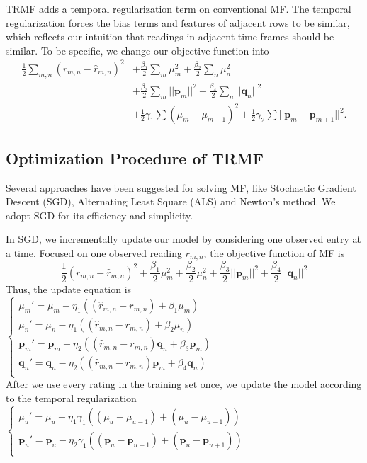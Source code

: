TRMF adds a temporal regularization term on conventional MF. The temporal regularization forces the bias terms and features of adjacent rows to be similar, which reflects our intuition that readings in adjacent time frames should be similar. To be specific, we change our objective function into 
\begin{equation*}\begin{aligned}
\frac{1}{2}\sum_{m,n}{(r_{m,n} - \hat{r}_{m,n})}^2 &+ \frac{\beta_1}{2}\sum_m{\mu_m^2} + \frac{\beta_2}{2}\sum_n{\mu_n^2}\\
&+ \frac{\beta_3}{2}\sum_m{||\mathbf{p}_m||^2} + \frac{\beta_4}{2}\sum_n{||\mathbf{q}_n||^2}\\ 
&+ \frac{1}{2}\gamma_1\sum{(\mu_m-\mu_{m+1})^2} + \frac{1}{2}\gamma_2\sum{||\mathbf{p}_m-\mathbf{p}_{m+1}||^2}.
\end{aligned}\end{equation*}

\subsection{Optimization Procedure of TRMF}
\label{optimation_procedure}
Several approaches have been suggested for solving MF, like Stochastic Gradient Descent (SGD)\cite{koren2009matrix,chih2008large}, Alternating Least Square (ALS)\cite{koren2009matrix,zhou2008large} and Newton's method\cite{buchanan2005damped}. We adopt SGD for its efficiency and simplicity. 

In SGD, we incrementally update our model by considering one observed entry at a time. Focused on one observed reading $r_{m,n}$, the objective function of MF is
\begin{equation*} \frac{1}{2}(r_{m,n} - \hat{r}_{m,n})^2 + \frac{\beta_1}{2}\mu_m^2 + \frac{\beta_2}{2}\mu_n^2 + \frac{\beta_3}{2}||\mathbf{p}_m||^2 + \frac{\beta_4}{2}||\mathbf{q}_n||^2\end{equation*}
Thus, the update equation is\\
$\begin{cases}
	\mu_m' = \mu_m - \eta_1 ((\hat{r}_{m,n}-r_{m,n}) + \beta_1 \mu_m) \\
	\mu_n' = \mu_n - \eta_1 ((\hat{r}_{m,n}-r_{m,n}) + \beta_2 \mu_n) \\
	\mathbf{p}_{m}' = \mathbf{p}_{m} - \eta_2 ((\hat{r}_{m,n}-r_{m,n})\mathbf{q}_{n} + \beta_3 \mathbf{p}_{m})\\
	\mathbf{q}_{n}' = \mathbf{q}_{n} - \eta_2 ((\hat{r}_{m,n}-r_{m,n})\mathbf{p}_{m} + \beta_4 \mathbf{q}_{n})\\
\end{cases}$\\
After we use every rating in the training set once, we update the model according to the temporal regularization
$\begin{cases}
	\mu_u' = \mu_u - \eta_1 \gamma_1((\mu_u-\mu_{u-1})+(\mu_u-\mu_{u+1}))\\
	\mathbf{p}_{u}' = \mathbf{p}_{u} - \eta_2 \gamma_1((\mathbf{p}_{u}-\mathbf{p}_{u-1})+(\mathbf{p}_{u}-\mathbf{p}_{u+1}))\\
\end{cases}$

